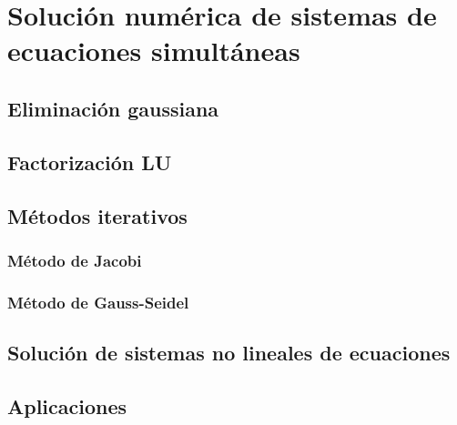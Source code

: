 \chapter{Solución numérica de sistemas de ecuaciones simultáneas}

\section{Eliminación gaussiana}

\section{Factorización LU}

\section{Métodos iterativos}

\subsection{Método de Jacobi}

\subsection{Método de Gauss-Seidel}

\section{Solución de sistemas no lineales de ecuaciones}

\section{Aplicaciones}